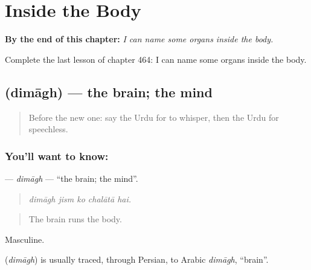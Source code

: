 
\chapter{Inside the Body}
\label{ch:ur-inside-the-body}

\begin{chapteropening}
\textbf{By the end of this chapter:} \emph{I can name some organs inside the body.}

Complete the last lesson of chapter 464: I can name some organs inside the body.
\end{chapteropening}

\section[\texorpdfstring{\ur{دماغ} (dimāgh)}{دماغ (dimāgh)}]{ (dimāgh) — the brain; the mind}

\label{lesson:UR-C464-dimagh}



\begin{quote}
Before the new one: say the Urdu for to whisper, then the Urdu for speechless.
\end{quote}

\subsection*{You'll want to know: }
\textbf{} — \emph{dimāgh} — \textquotedblleft{}the brain; the mind\textquotedblright{}.

\begin{quote}
    
\end{quote}

\begin{quote}
\emph{dimāgh jism ko chalātā hai.}
\end{quote}

\begin{quote}
The brain runs the body.
\end{quote}

Masculine.

\begin{cousinweb}
\textbf{} (\emph{dimāgh}) is usually traced, through Persian, to Arabic \emph{dimāgh}, \textquotedblleft{}brain\textquotedblright{}.
\end{cousinweb}

